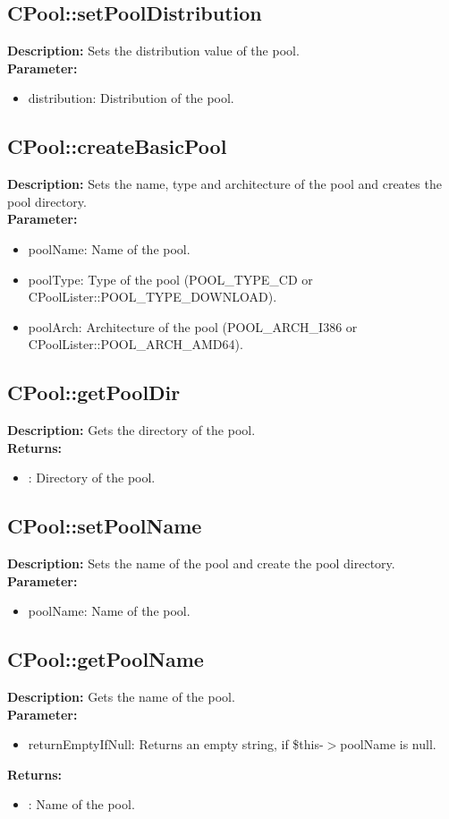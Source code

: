 \subsection{CPool::setPoolDistribution}
\textbf{Description:} Sets the distribution value of the pool.\\
\textbf{Parameter:}
\begin{itemize}
\item distribution: Distribution of the pool.
\end{itemize}

\subsection{CPool::createBasicPool}
\textbf{Description:} Sets the name, type and architecture of the pool and creates the pool directory.\\
\textbf{Parameter:}
\begin{itemize}
\item poolName: Name of the pool.
\item poolType: Type of the pool (POOL\_TYPE\_CD or CPoolLister::POOL\_TYPE\_DOWNLOAD).
\item poolArch: Architecture of the pool (POOL\_ARCH\_I386 or CPoolLister::POOL\_ARCH\_AMD64).
\end{itemize}

\subsection{CPool::getPoolDir}
\textbf{Description:} Gets the directory of the pool.\\
\textbf{Returns:}
\begin{itemize}
\item : Directory of the pool.
\end{itemize}

\subsection{CPool::setPoolName}
\textbf{Description:} Sets the name of the pool and create the pool directory.\\
\textbf{Parameter:}
\begin{itemize}
\item poolName: Name of the pool.
\end{itemize}

\subsection{CPool::getPoolName}
\textbf{Description:} Gets the name of the pool.\\
\textbf{Parameter:}
\begin{itemize}
\item returnEmptyIfNull: Returns an empty string, if \$this-$>$poolName is null.
\end{itemize}
\textbf{Returns:}
\begin{itemize}
\item : Name of the pool.
\end{itemize}

